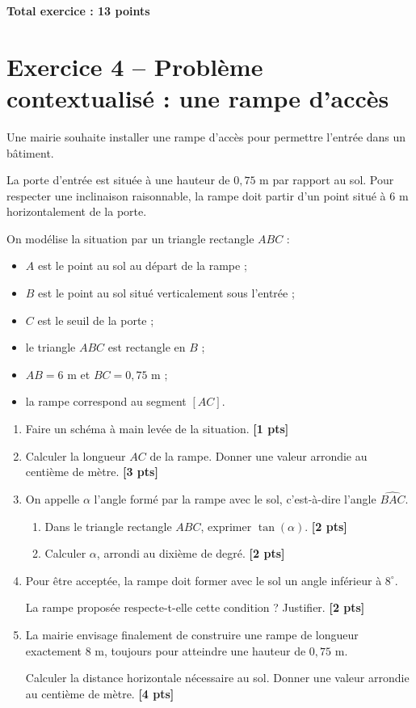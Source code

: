 \documentclass[11pt,a4paper]{article}
\newcommand{\points}[1]{\hfill \textbf{[#1 pts]}}
\newcommand{\totalexo}[1]{\begin{flushright}\textbf{Total exercice : #1 points}\end{flushright}}
\begin{document}
\totalexo{13}

\section*{Exercice 4 -- Problème contextualisé : une rampe d'accès}

Une mairie souhaite installer une rampe d'accès pour permettre l'entrée dans un bâtiment.

La porte d'entrée est située à une hauteur de $0,75$ m par rapport au sol.  
Pour respecter une inclinaison raisonnable, la rampe doit partir d'un point situé à $6$ m horizontalement de la porte.

On modélise la situation par un triangle rectangle $ABC$ :

\begin{itemize}
    \item $A$ est le point au sol au départ de la rampe ;
    \item $B$ est le point au sol situé verticalement sous l'entrée ;
    \item $C$ est le seuil de la porte ;
    \item le triangle $ABC$ est rectangle en $B$ ;
    \item $AB=6$ m et $BC=0,75$ m ;
    \item la rampe correspond au segment $[AC]$.
\end{itemize}

\begin{enumerate}
    \item Faire un schéma à main levée de la situation. \points{1}

    \item Calculer la longueur $AC$ de la rampe. Donner une valeur arrondie au centième de mètre. \points{3}

    \item On appelle $\alpha$ l'angle formé par la rampe avec le sol, c'est-à-dire l'angle $\widehat{BAC}$.
    \begin{enumerate}
        \item Dans le triangle rectangle $ABC$, exprimer $\tan(\alpha)$. \points{2}
        \item Calculer $\alpha$, arrondi au dixième de degré. \points{2}
    \end{enumerate}

    \item Pour être acceptée, la rampe doit former avec le sol un angle inférieur à $8^\circ$.
    
    La rampe proposée respecte-t-elle cette condition ? Justifier. \points{2}

    \item La mairie envisage finalement de construire une rampe de longueur exactement $8$ m, toujours pour atteindre une hauteur de $0,75$ m.
    
    Calculer la distance horizontale nécessaire au sol. Donner une valeur arrondie au centième de mètre. \points{4}
\end{enumerate}
\end{document}
